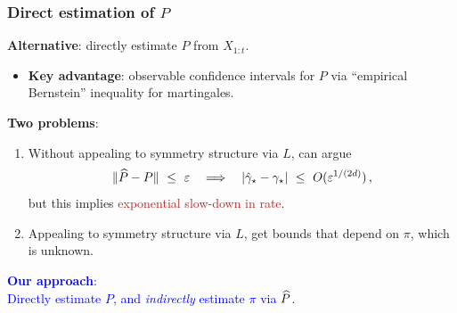 \documentclass[11pt,compress,blue4,notheorem]{beamer}
\newcommand{\BLUE}[1]{\textcolor{blue}{#1}}
\newcommand{\FIREBRICK}[1]{\textcolor{firebrick}{#1}}
\newcommand\gap{\ensuremath{\gamma_{\star}}}
\newcommand\hatgap{\ensuremath{\hat{\gamma}_{\star}}}
\begin{document}
\begin{frame}
  \frametitle{Direct estimation of $P$}

  \textbf{Alternative}: directly estimate $P$ from $X_{1:t}$.

  \begin{itemize}
    \item<2->
      \textbf{Key advantage}: observable confidence intervals for $P$
      via ``empirical Bernstein'' inequality for martingales.

  \end{itemize}

  \textbf{Two problems}:
  \begin{enumerate}
    \item<4->
      Without appealing to symmetry structure via $L$, can argue
      \[
        \norm{\wh{P} - P} \ \leq \ \veps
        \quad\Longrightarrow\quad
        \abs{\hatgap - \gap} \ \leq \ O(\veps^{1/(2d)})
        \,,
      \]
      but this implies \FIREBRICK{exponential slow-down in rate}.

      \medskip

    \item<5->
      Appealing to symmetry structure via $L$, get bounds that depend
      on $\pi$, which is unknown.

  \end{enumerate}

  \begin{center}
    \BLUE{%
      \textbf{Our approach}: \\
      Directly estimate $P$, and \emph{indirectly} estimate $\pi$ via
      $\widehat P$.
    }
  \end{center}

\end{frame}

\end{document}

